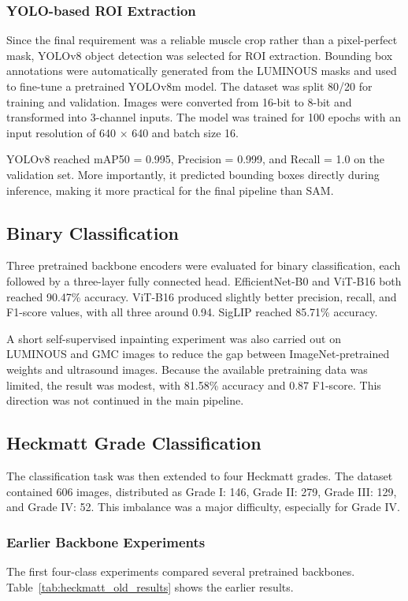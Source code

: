 \documentclass[twocolumn,10pt]{article}
\begin{document}
\subsubsection{YOLO-based ROI Extraction}
Since the final requirement was a reliable muscle crop rather than a pixel-perfect mask, YOLOv8 object detection was selected for ROI extraction. Bounding box annotations were automatically generated from the LUMINOUS masks and used to fine-tune a pretrained YOLOv8m model. The dataset was split 80/20 for training and validation. Images were converted from 16-bit to 8-bit and transformed into 3-channel inputs. The model was trained for 100 epochs with an input resolution of 640 $\times$ 640 and batch size 16.

YOLOv8 reached mAP50 = 0.995, Precision = 0.999, and Recall = 1.0 on the validation set. More importantly, it predicted bounding boxes directly during inference, making it more practical for the final pipeline than SAM.

\subsection{Binary Classification}
Three pretrained backbone encoders were evaluated for binary classification, each followed by a three-layer fully connected head. EfficientNet-B0 and ViT-B16 both reached 90.47\% accuracy. ViT-B16 produced slightly better precision, recall, and F1-score values, with all three around 0.94. SigLIP reached 85.71\% accuracy.

A short self-supervised inpainting experiment was also carried out on LUMINOUS and GMC images to reduce the gap between ImageNet-pretrained weights and ultrasound images. Because the available pretraining data was limited, the result was modest, with 81.58\% accuracy and 0.87 F1-score. This direction was not continued in the main pipeline.

\subsection{Heckmatt Grade Classification}
The classification task was then extended to four Heckmatt grades. The dataset contained 606 images, distributed as Grade I: 146, Grade II: 279, Grade III: 129, and Grade IV: 52. This imbalance was a major difficulty, especially for Grade IV.

\subsubsection{Earlier Backbone Experiments}
The first four-class experiments compared several pretrained backbones. Table~\ref{tab:heckmatt_old_results} shows the earlier results.
\end{document}

